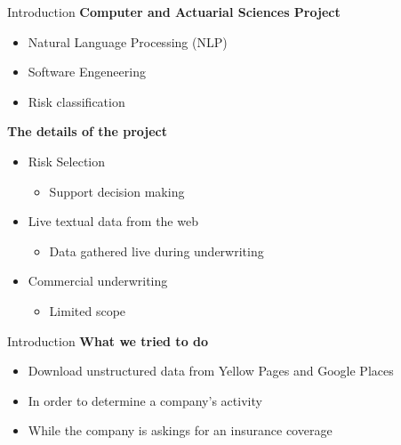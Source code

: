 

\begin{frame}[label=intro]{Introduction}
	\textbf{Computer and Actuarial Sciences Project}
	\begin{itemize}
		
		\item Natural Language Processing (NLP)
		\item Software Engeneering
		\item Risk classification
		
	\end{itemize}
	
	\textbf{The details of the project}
	\begin{itemize}
		\item Risk Selection
		\begin{itemize}
			\item Support decision making
		\end{itemize}			
		\item Live textual data from the web
		\begin{itemize}
			\item Data gathered live during underwriting
		\end{itemize}
		\item Commercial underwriting
		\begin{itemize}
			\item Limited scope
		\end{itemize}
	\end{itemize}
	
\end{frame}



\begin{frame}[label=intro]{Introduction}
	\textbf{What we tried to do}
	\begin{itemize}
		\item Download unstructured data from Yellow Pages and Google Places
		\item In order to determine a company's activity
		\item While the company is askings for an insurance coverage
	\end{itemize}
\end{frame}

